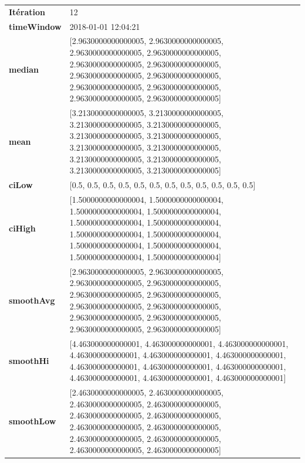 \begin{table}[H]
	\centering
	\begin{tabularx}{\textwidth}{lX}
		\textbf{Itération}& 12 \\
		\textbf{timeWindow}	 &  2018-01-01 12:04:21  \\
		\textbf{median} &[2.9630000000000005, 2.9630000000000005, 2.9630000000000005, 2.9630000000000005, 2.9630000000000005, 2.9630000000000005, 2.9630000000000005, 2.9630000000000005, 2.9630000000000005, 2.9630000000000005, 2.9630000000000005, 2.9630000000000005] 
		\\ 
		\textbf{mean} & [3.2130000000000005, 3.2130000000000005, 3.2130000000000005, 3.2130000000000005, 3.2130000000000005, 3.2130000000000005, 3.2130000000000005, 3.2130000000000005, 3.2130000000000005, 3.2130000000000005, 3.2130000000000005, 3.2130000000000005] 
		
		\\
		\textbf{ciLow} &[0.5, 0.5, 0.5, 0.5, 0.5, 0.5, 0.5, 0.5, 0.5, 0.5, 0.5, 0.5]  
		\\
		\textbf{ciHigh}&  [1.5000000000000004, 1.5000000000000004, 1.5000000000000004, 1.5000000000000004, 1.5000000000000004, 1.5000000000000004, 1.5000000000000004, 1.5000000000000004, 1.5000000000000004, 1.5000000000000004, 1.5000000000000004, 1.5000000000000004] 
		\\
		\textbf{smoothAvg} & [2.9630000000000005, 2.9630000000000005, 2.9630000000000005, 2.9630000000000005, 2.9630000000000005, 2.9630000000000005, 2.9630000000000005, 2.9630000000000005, 2.9630000000000005, 2.9630000000000005, 2.9630000000000005, 2.9630000000000005] 
		
		\\
		\textbf{smoothHi} & [4.463000000000001, 4.463000000000001, 4.463000000000001, 4.463000000000001, 4.463000000000001, 4.463000000000001, 4.463000000000001, 4.463000000000001, 4.463000000000001, 4.463000000000001, 4.463000000000001, 4.463000000000001] 
		\\
		\textbf{smoothLow} & [2.4630000000000005, 2.4630000000000005, 2.4630000000000005, 2.4630000000000005, 2.4630000000000005, 2.4630000000000005, 2.4630000000000005, 2.4630000000000005, 2.4630000000000005, 2.4630000000000005, 2.4630000000000005, 2.4630000000000005]
		
		\\ 
	\end{tabularx} 
\end{table}



